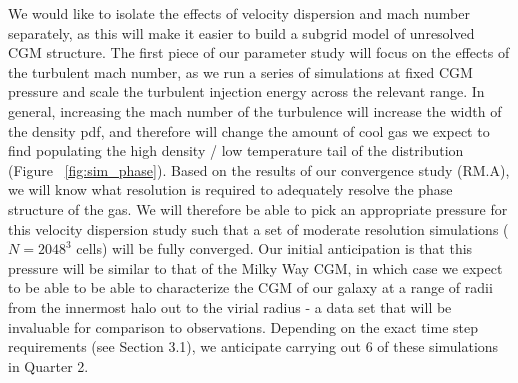 \documentclass[11pt,letterpaper,english]{article}
\begin{document}
We would like to isolate the effects of velocity dispersion and mach number separately, as this will make it easier to build a subgrid model of unresolved CGM structure. The first piece of our parameter study will focus on the effects of the turbulent mach number, as we run a series of simulations at fixed CGM pressure and scale the turbulent injection energy across the relevant range. In general, increasing the mach number of the turbulence will increase the width of the density pdf, and therefore will change the amount of cool gas we expect to find populating the high density / low temperature tail of the distribution (Figure ~\ref{fig:sim_phase}). Based on the results of our convergence study (RM.A), we will know what resolution is required to adequately resolve the phase structure of the gas. We will therefore be able to pick an appropriate pressure for this velocity dispersion study such that a set of moderate resolution simulations ($N = 2048^3$ cells) will be fully converged. Our initial anticipation is that this pressure will be similar to that of the Milky Way CGM, in which case we expect to be able to be able to characterize the CGM of our galaxy at a range of radii from the innermost halo out to the virial radius - a data set that will be invaluable for comparison to observations. Depending on the exact time step requirements (see Section 3.1), we anticipate carrying out 6 of these simulations in Quarter 2.
\end{document}

